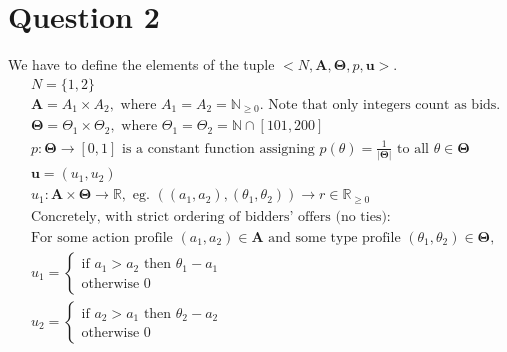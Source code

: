 \documentclass[10pt,a4paper]{article}
\begin{document}
\section*{Question 2}
We have to define the elements of the tuple $<N,\bm{A},\bm{\Theta},p,\bm{u}>$.
\begin{align*}
&N=\{1,2\} \\
&\bm{A}=A_1\times A_2, \text{ where $A_1=A_2=\mathbb{N}_{\geq 0}$}\text{. Note that only integers count as bids.}\\
&\bm{\Theta}=\Theta_1 \times \Theta_2, \text{ where $\Theta_1=\Theta_2= \mathbb{N}\cap [101,200]$}\\
&p: \bm{\Theta} \rightarrow [0,1] \text{ is a constant function assigning $p(\theta)=\tfrac{1}{|\bm{\Theta}|}$ to all $\theta \in \bm{\Theta}$}\\
&\bm{u}=(u_1,u_2)\\
&u_1:\bm{A}\times \bm{\Theta} \rightarrow \mathbb{R},\text{ eg. $((a_1,a_2),(\theta_1, \theta_2))\rightarrow r\in \mathbb{R}_{\geq 0}$}\\
&\text{Concretely, with strict ordering of bidders' offers (no ties):}\\
&\text{For some action profile $(a_1,a_2)\in\bm{A}$ and some type profile $(\theta_1,\theta_2)\in \bm{\Theta}$,}\\
&u_1=\begin{cases}
\text{if } a_1>a_2 \text{ then }\theta_1-a_1 \\
\text{otherwise } 0
\end{cases}\\
&u_2=\begin{cases}
\text{if } a_2>a_1 \text{ then }\theta_2-a_2 \\
\text{otherwise } 0
\end{cases}
\end{align*}
\end{document}
